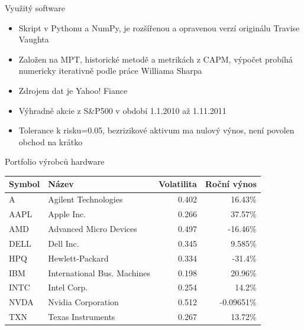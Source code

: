 \begin{frame}{Využitý software}
  \begin{itemize}
    \item
      Skript v Pythonu a NumPy, je rozšířenou a opravenou verzí originálu Travise Vaughta\cite{tvaught}
    \item
      Založen na MPT, historické metodě a metrikách z CAPM, výpočet probíhá numericky iterativně podle práce Williama Sharpa\cite{sharpe}
    \item
      Zdrojem dat je Yahoo! Fiance\cite{yahoo}
    \item
      Výhradně akcie z S\&P500 v období 1.1.2010 až 1.11.2011
    \item
      Tolerance k risku=0.05, bezrizikové aktivum ma nulový výnos, není povolen obchod na krátko
  \end{itemize}
\end{frame}

\begin{frame}{Portfolio výrobců hardware}
      \begin{tabular}{|l|l|r|r|}
        \hline
        Symbol&Název&Volatilita&Roční výnos\\\hline\hline
        A&Agilent Technologies &0.402&16.43\%\\\hline
        AAPL&Apple Inc. &0.266&37.57\%\\\hline
        AMD&Advanced Micro Devices &0.497&-16.46\%\\\hline
        DELL&Dell Inc. &0.345&9.585\%\\\hline
        HPQ&Hewlett-Packard &0.334&-31.4\%\\\hline
        IBM&International Bus. Machines &0.198&20.96\%\\\hline
        INTC&Intel Corp. &0.254&14.2\%\\\hline
        NVDA&Nvidia Corporation &0.512&-0.09651\%\\\hline
        TXN&Texas Instruments &0.267&13.72\%\\\hline
      \end{tabular}
\end{frame}

